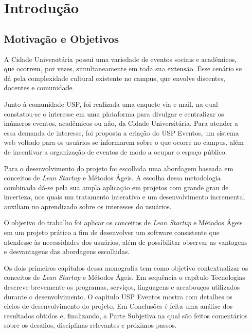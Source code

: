 \chapter{Introdução}
\label{cap:introducao}
\section{Motivação e Objetivos}

\par A Cidade Universitária possui uma variedade de eventos sociais e acadêmicos, que ocorrem, por vezes, simultaneamente em toda sua extensão. Esse cenário se dá pela complexidade cultural existente no campus, que envolve discentes, docentes e comunidade.

\par Junto à comunidade USP, foi realizada uma enquete via e-mail, na qual constatou-se o interesse em uma plataforma para divulgar e centralizar os inúmeros eventos, acadêmicos ou não, da Cidade Universitária. Para atender a essa demanda de interesse, foi proposta a criação do USP Eventos, um sistema web voltado para os usuários se informarem sobre o que ocorre no campus, além de incentivar a organização de eventos de modo a ocupar o espaço público.

\par Para o desenvolvimento do projeto foi escolhida uma abordagem baseada em conceitos de \emph{Lean Startup} e Métodos Ágeis. A escolha dessa metodologia combinada dá-se pela sua ampla aplicação em projetos com grande grau de incerteza, nos quais um tratamento interativo e um desenvolvimento incremental auxiliam no aprendizado sobre os interesses do usuários.

\par O objetivo do trabalho foi aplicar os conceitos de \emph{Lean Startup} e Métodos Ágeis em um projeto prático a fim de desenvolver um software consistente que atendesse às necessidades dos usuários, além de possibilitar observar as vantagens e desvantagens das abordagens escolhidas.

\par Os dois primeiros capítulos dessa monografia tem como objetivo contextualizar os conceitos de \emph{Lean Startup} e Métodos Ágeis. Em sequência o capítulo Tecnologias descreve brevemente os programas, serviços, linguagens e arcabouços utilizados durante o desenvolvimento. O capítulo USP Eventos mostra com detalhes os ciclos de desenvolvimento do projeto. Em Conclusões é feita uma análise dos resultados obtidos e, finalizando, a Parte Subjetiva na qual são feitos comentários sobre os desafios, disciplinas relevantes e próximos passos.
